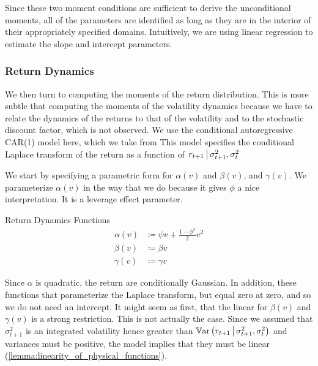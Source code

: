\documentclass[11pt, letterpaper, twoside, final]{article}
\begin{document}
Since these two moment conditions are sufficient to derive the unconditional moments, all of the parameters are
identified as long as they are in the interior of their appropriately specified domains.
Intuitively, we are using linear regression to estimate the slope and intercept parameters.


\subsubsection{Return Dynamics}

We then turn to computing the moments of the return distribution. 
This is more subtle that computing the moments of the volatility dynamics because we have to relate the dynamics
of the returns to that of the volatility and to the stochastic discount factor, which is not observed. 
We use the conditional autoregressive CAR(1) model here, which we take from
\textcite{darolles2006structural,khrapov2016affine}
This model  specifies the conditional Laplace transform of the return as a function of $\left. r_{t+1} \,\middle\vert\,
\sigma^2_{t+1}, \sigma^2_t \right.$

We start by specifying a parametric form for $\alpha(v)$ and $\beta(v)$, and $\gamma(v)$.
We parameterize $\alpha(v)$ in the way that we do because it gives $\phi$ a nice interpretation.
It is a leverage effect parameter.

\begin{defn}{Return Dynamics Functions}
    \label{defn:physical_return_dynamics}
    \begin{align}
        \alpha(v) &\coloneqq \psi v + \frac{1 - \phi^2}{2} v^2 \\
        \beta(v) &\coloneqq \beta v  \\
        \gamma(v) &\coloneqq \gamma v  
    \end{align}
\end{defn}

Since $\alpha$ is quadratic, the return are conditionally Gaussian.
In addition, these functions that parameterize the Laplace transform, but equal zero at zero, and so we do not
need an intercept.
It might seem as first, that the linear for $\beta(v)$ and $\gamma(v)$ is a strong restriction.
This is not actually the case.
Since we assumed that $\sigma^2_{t+1}$ is an integrated volatility hence greater than $\operatorname{\mathbb{V}ar}\left(r_{t+1} \,\middle\vert\,
\sigma^2_{t+1}, \sigma^2_{t}\right)$ and variances must be positive, the model implies that they must be linear
(\cref{lemma:linearity_of_physical_functions}).
\end{document}

